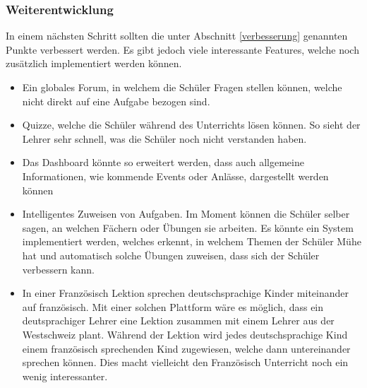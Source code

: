 \subsubsection{Weiterentwicklung}
In einem nächsten Schritt sollten die unter Abschnitt \ref{verbesserung} genannten Punkte verbessert werden. Es gibt jedoch viele interessante Features, welche noch zusätzlich implementiert werden können.

\begin{itemize}
	\item Ein globales Forum, in welchem die Schüler Fragen stellen können, welche nicht direkt auf eine Aufgabe bezogen sind.
	\item Quizze, welche die Schüler während des Unterrichts lösen können. So sieht der Lehrer sehr schnell, was die Schüler noch nicht verstanden haben.
	\item Das Dashboard könnte so erweitert werden, dass auch allgemeine Informationen, wie kommende Events oder Anlässe, dargestellt werden können
	\item Intelligentes Zuweisen von Aufgaben. Im Moment können die Schüler selber sagen, an welchen Fächern oder Übungen sie arbeiten. Es könnte ein System implementiert werden, welches erkennt, in welchem Themen der Schüler Mühe hat und automatisch solche Übungen zuweisen, dass sich der Schüler verbessern kann.
	\item In einer Französisch Lektion sprechen deutschsprachige Kinder miteinander auf französisch.	Mit einer solchen Plattform wäre es möglich, dass ein deutsprachiger Lehrer eine Lektion zusammen mit einem Lehrer aus der Westschweiz plant. Während der Lektion wird jedes deutschsprachige Kind einem französisch sprechenden Kind zugewiesen, welche dann untereinander sprechen können. Dies macht vielleicht den Französisch Unterricht noch ein wenig interessanter.
\end{itemize}
\newpage
